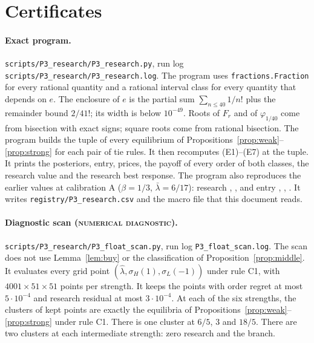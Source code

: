 \documentclass[12pt]{article}
\theoremstyle{definition}
\theoremstyle{remark}
\newcommand{\lh}{\hat\lambda}
\newcommand{\lb}{\bar\lambda}
\newcommand{\st}[1]{\textsc{#1}}
\begin{document}
\section{Certificates}\label{sec:cert}

\paragraph{Exact program.} \texttt{scripts/P3\_research/P3\_research.py}, run log
\texttt{scripts/P3\_research/P3\_research.log}. The program uses \texttt{fractions.Fraction} for every rational
quantity and a rational interval class for every quantity that depends on $e$. The enclosure of $e$ is the partial
sum $\sum_{n\le40}1/n!$ plus the remainder bound $2/41!$; its width is below $10^{-49}$. Roots of $F_r$ and of
$\varphi_{1/40}$ come from bisection with exact signs; square roots come from rational bisection. The program
builds the tuple of every equilibrium of Propositions~\ref{prop:weak}--\ref{prop:strong} for each pair of tie rules.
It then recomputes (E1)--(E7) at the tuple. It prints the posteriors, entry, prices, the payoff of every order of
both classes, the research value and the research best response. The program also reproduces the earlier values at calibration A
($\beta=1/3$, $\lb=6/17$): research , , 
and entry , , .
It writes \texttt{registry/P3\_research.csv} and the macro file that this document reads.

\paragraph{Diagnostic scan (\st{numerical diagnostic}).} \texttt{scripts/P3\_research/P3\_float\_scan.py}, run log
\texttt{P3\_float\_scan.log}. The scan does not use Lemma~\ref{lem:buy} or the classification of Proposition~\ref{prop:middle}. It evaluates every
grid point $(\lh,\sigma_H(1),\sigma_L(-1))$ under rule C1, with $4001\times51\times51$ points per strength. It keeps
the points with order regret at most $5\cdot10^{-4}$ and research residual at most $3\cdot10^{-4}$. At each of the six
strengths, the clusters of kept points are exactly the equilibria of
Propositions~\ref{prop:weak}--\ref{prop:strong} under rule C1. There is one cluster at $6/5$, $3$ and $18/5$. There are
two clusters at each intermediate strength: zero research and the branch.
\end{document}
